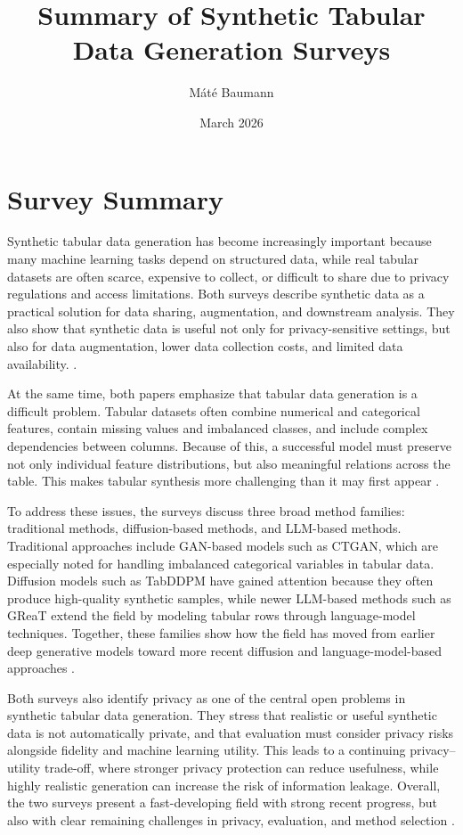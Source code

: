 \documentclass{article}
\title{Summary of Synthetic Tabular Data Generation Surveys}
\author{Máté Baumann}
\date{March 2026}
\begin{document}
\maketitle

\section{Survey Summary}

Synthetic tabular data generation has become increasingly important because many machine learning tasks depend on structured data, while real tabular datasets are often scarce, expensive to collect, or difficult to share due to privacy regulations and access limitations. Both surveys describe synthetic data as a practical solution for data sharing, augmentation, and downstream analysis. They also show that synthetic data is useful not only for privacy-sensitive settings, but also for data augmentation, lower data collection costs, and limited data availability. \cite{chal,shi}.

At the same time, both papers emphasize that tabular data generation is a difficult problem. Tabular datasets often combine numerical and categorical features, contain missing values and imbalanced classes, and include complex dependencies between columns. Because of this, a successful model must preserve not only individual feature distributions, but also meaningful relations across the table. This makes tabular synthesis more challenging than it may first appear \cite{chal,shi}.

To address these issues, the surveys discuss three broad method families: traditional methods, diffusion-based methods, and LLM-based methods. Traditional approaches include GAN-based models such as CTGAN, which are especially noted for handling imbalanced categorical variables in tabular data. Diffusion models such as TabDDPM have gained attention because they often produce high-quality synthetic samples, while newer LLM-based methods such as GReaT extend the field by modeling tabular rows through language-model techniques. Together, these families show how the field has moved from earlier deep generative models toward more recent diffusion and language-model-based approaches \cite{chal,shi}.

Both surveys also identify privacy as one of the central open problems in synthetic tabular data generation. They stress that realistic or useful synthetic data is not automatically private, and that evaluation must consider privacy risks alongside fidelity and machine learning utility. This leads to a continuing privacy--utility trade-off, where stronger privacy protection can reduce usefulness, while highly realistic generation can increase the risk of information leakage. Overall, the two surveys present a fast-developing field with strong recent progress, but also with clear remaining challenges in privacy, evaluation, and method selection \cite{chal,shi}.




\end{document}

